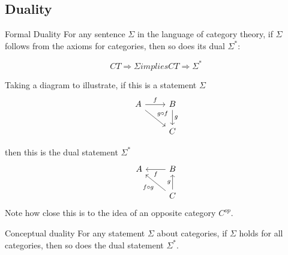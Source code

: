 \documentclass[../../notes.tex]{subfiles}
\begin{document}
\subsection{Duality}
\begin{proposition}{Formal Duality}
  For any sentence $\Sigma$ in the language of category theory, if $\Sigma$
  follows from the axioms for categories, then so does its dual $\Sigma^*$:

  $$ CT \Rightarrow \Sigma implies CT \Rightarrow \Sigma^* $$
\end{proposition}

Taking a diagram to illustrate, if this is a statement $\Sigma$
\[
  \begin{tikzcd}
    A \arrow[r, "f"] \arrow[dr, "g \circ f"] & B \arrow[d, "g"] \\
    & C
  \end{tikzcd}
\]

then this is the dual statement $\Sigma^*$
\[
  \begin{tikzcd}
    A  & B \arrow[l, "f"] \\
    & C \arrow[ul, "f \circ g"] \arrow[u, "g"]
  \end{tikzcd}
\]
Note how close this is to the idea of an opposite category $C^{op}$.

\begin{proposition}{Conceptual duality}
  For any statement $\Sigma$ about categories, if $\Sigma$ holds for
  all categories, then so does the dual statement $\Sigma^*$.
\end{proposition}
\end{document}
